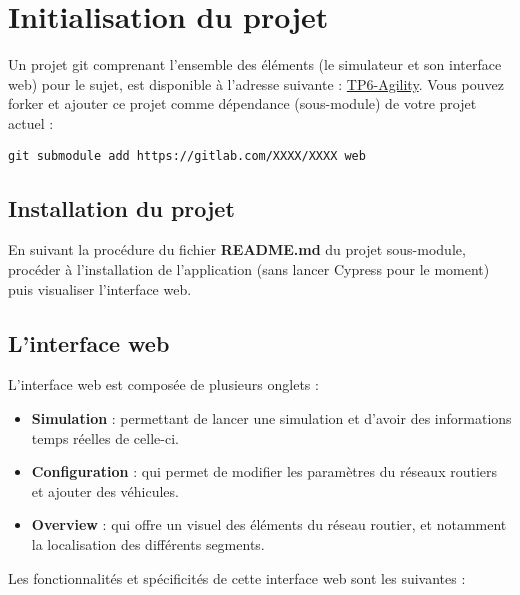 \documentclass[11pt,a4paper,oneside]{article}
\begin{document}
\section{Initialisation du projet}

Un projet git comprenant l'ensemble des éléments (le simulateur et son interface web) pour le sujet, est disponible à l'adresse suivante : \href{https://gitlab.com/jbuisine/2021-2022-m1-agility-tp6}{TP6-Agility}. Vous pouvez forker et ajouter ce projet comme dépendance (sous-module) de votre projet actuel :
\begin{lstlisting}[style=custombash]
git submodule add https://gitlab.com/XXXX/XXXX web
\end{lstlisting}

\subsection{Installation du projet}
 
En suivant la procédure du fichier \textbf{README.md} du projet sous-module, procéder à l'installation de l'application (sans lancer Cypress pour le moment) puis visualiser l'interface web.
 
\vspace{5mm}
 
\subsection{L'interface web}

L'interface web est composée de plusieurs onglets :

\begin{itemize}
	\item \textbf{Simulation} : permettant de lancer une simulation et d'avoir des informations temps réelles de celle-ci.
	\item \textbf{Configuration} : qui permet de modifier les paramètres du réseaux routiers et ajouter des véhicules.
	\item \textbf{Overview} : qui offre un visuel des éléments du réseau routier, et notamment la localisation des différents segments. 
\end{itemize}

\vspace{5mm}
Les fonctionnalités et spécificités de cette interface web sont les suivantes :
\end{document}
